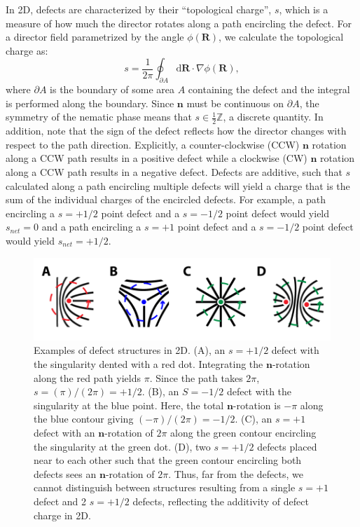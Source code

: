 In 2D, defects are characterized by their ``topological charge'', $s$, which is a measure of how much the director rotates along a path encircling the defect.
For a director field parametrized by the angle $\phi(\mathbf{R})$, we calculate the topological charge as:
\begin{equation}
  s = \frac{1}{2 \pi}\oint_{\partial A} \textrm{d}\mathbf{R} \cdot \nabla\phi(\mathbf{R}),\label{eq:2-topCharge}
\end{equation}
where $\partial A$ is the boundary of some area $A$ containing the defect and the integral is performed along the boundary.
Since $\mathbf{n}$ must be continuous on $\partial A$, the symmetry of the nematic phase means that $s \in \frac{1}{2} \mathbb{Z}$, a discrete quantity.
In addition, note that the sign of the defect reflects how the director changes with respect to the path direction.
Explicitly, a counter-clockwise (CCW) $\mathbf{n}$ rotation along a CCW path results in a positive defect while a clockwise (CW) $\mathbf{n}$ rotation along a CCW path results in a negative defect.
Defects are additive, such that $s$ calculated along a path encircling multiple defects will yield a charge that is the sum of the individual charges of the encircled defects.
For example, a path encircling a $s = +1/2$ point defect and a $s = -1/2$ point defect would yield $s_{net} = 0$ and a path encircling a $s = +1$ point defect and a $s = -1/2$ point defect would yield $s_{net}= +1/2$.\\

\begin{figure}[h]
  \centering
  \includegraphics{figures/C2/Ch2-Figs_2DMeas.png}
  \caption{Examples of defect structures in 2D.
  (A), an $s=+1/2$ defect with the singularity dented with a red dot.
  Integrating the $\mathbf{n}$-rotation along the red path yields $\pi$.
  Since the path takes $2 \pi$, $s = (\pi)/(2 \pi) = +1/2$.
  (B), an $S = -1/2$ defect with the singularity at the blue point.
  Here, the total $\mathbf{n}$-rotation is $-\pi$ along the blue contour giving $(-\pi)/(2 \pi) = -1/2$.
  (C), an $s = +1$ defect with an $\mathbf{n}$-rotation of $2 \pi$ along the green contour encircling the singularity at the green dot.
  (D), two $s = +1/2$ defects placed near to each other such that the green contour encircling both defects sees an $\mathbf{n}$-rotation of $2 \pi$.
  Thus, far from the defects, we cannot distinguish between structures resulting from a single $s = +1$ defect and 2 $s = +1/2$ defects, reflecting the additivity of defect charge in 2D.}\label{f:2-2DMeas}
\end{figure}

